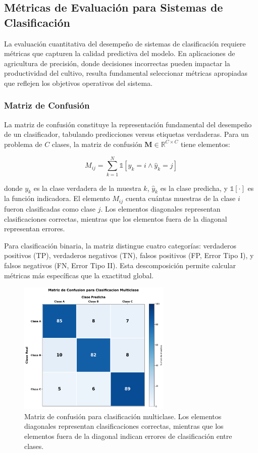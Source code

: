\subsection{Métricas de Evaluación para Sistemas de Clasificación}

La evaluación cuantitativa del desempeño de sistemas de clasificación requiere métricas que capturen la calidad predictiva del modelo. En aplicaciones de agricultura de precisión, donde decisiones incorrectas pueden impactar la productividad del cultivo, resulta fundamental seleccionar métricas apropiadas que reflejen los objetivos operativos del sistema.

\subsubsection{Matriz de Confusión}

La matriz de confusión constituye la representación fundamental del desempeño de un clasificador, tabulando predicciones versus etiquetas verdaderas. Para un problema de $C$ clases, la matriz de confusión $\mathbf{M} \in \mathbb{R}^{C \times C}$ tiene elementos:

\begin{equation}
M_{ij} = \sum_{k=1}^{N} \mathbb{1}[y_k = i \land \hat{y}_k = j]
\end{equation}

donde $y_k$ es la clase verdadera de la muestra $k$, $\hat{y}_k$ es la clase predicha, y $\mathbb{1}[\cdot]$ es la función indicadora. El elemento $M_{ij}$ cuenta cuántas muestras de la clase $i$ fueron clasificadas como clase $j$. Los elementos diagonales representan clasificaciones correctas, mientras que los elementos fuera de la diagonal representan errores.

Para clasificación binaria, la matriz distingue cuatro categorías: verdaderos positivos (TP), verdaderos negativos (TN), falsos positivos (FP, Error Tipo I), y falsos negativos (FN, Error Tipo II). Esta descomposición permite calcular métricas más específicas que la exactitud global.

\begin{figure}[h]
\centering
\includegraphics[width=0.65\textwidth]{imagenes/matriz_confusion_ejemplo.png}
\caption{Matriz de confusión para clasificación multiclase. Los elementos diagonales representan clasificaciones correctas, mientras que los elementos fuera de la diagonal indican errores de clasificación entre clases.}
\label{fig:matriz_confusion}
\end{figure}

